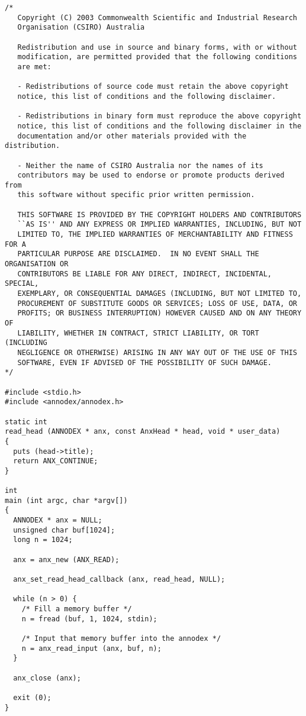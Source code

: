 \footnotesize\begin{verbatim}/*
   Copyright (C) 2003 Commonwealth Scientific and Industrial Research
   Organisation (CSIRO) Australia

   Redistribution and use in source and binary forms, with or without
   modification, are permitted provided that the following conditions
   are met:

   - Redistributions of source code must retain the above copyright
   notice, this list of conditions and the following disclaimer.

   - Redistributions in binary form must reproduce the above copyright
   notice, this list of conditions and the following disclaimer in the
   documentation and/or other materials provided with the distribution.

   - Neither the name of CSIRO Australia nor the names of its
   contributors may be used to endorse or promote products derived from
   this software without specific prior written permission.

   THIS SOFTWARE IS PROVIDED BY THE COPYRIGHT HOLDERS AND CONTRIBUTORS
   ``AS IS'' AND ANY EXPRESS OR IMPLIED WARRANTIES, INCLUDING, BUT NOT
   LIMITED TO, THE IMPLIED WARRANTIES OF MERCHANTABILITY AND FITNESS FOR A
   PARTICULAR PURPOSE ARE DISCLAIMED.  IN NO EVENT SHALL THE ORGANISATION OR
   CONTRIBUTORS BE LIABLE FOR ANY DIRECT, INDIRECT, INCIDENTAL, SPECIAL,
   EXEMPLARY, OR CONSEQUENTIAL DAMAGES (INCLUDING, BUT NOT LIMITED TO,
   PROCUREMENT OF SUBSTITUTE GOODS OR SERVICES; LOSS OF USE, DATA, OR
   PROFITS; OR BUSINESS INTERRUPTION) HOWEVER CAUSED AND ON ANY THEORY OF
   LIABILITY, WHETHER IN CONTRACT, STRICT LIABILITY, OR TORT (INCLUDING
   NEGLIGENCE OR OTHERWISE) ARISING IN ANY WAY OUT OF THE USE OF THIS
   SOFTWARE, EVEN IF ADVISED OF THE POSSIBILITY OF SUCH DAMAGE.
*/

#include <stdio.h>
#include <annodex/annodex.h>

static int
read_head (ANNODEX * anx, const AnxHead * head, void * user_data)
{
  puts (head->title);
  return ANX_CONTINUE;
}

int
main (int argc, char *argv[])
{
  ANNODEX * anx = NULL;
  unsigned char buf[1024];
  long n = 1024;

  anx = anx_new (ANX_READ);

  anx_set_read_head_callback (anx, read_head, NULL);

  while (n > 0) {
    /* Fill a memory buffer */
    n = fread (buf, 1, 1024, stdin);

    /* Input that memory buffer into the annodex */
    n = anx_read_input (anx, buf, n);
  }

  anx_close (anx);

  exit (0);
}
\end{verbatim}
\normalsize
 

